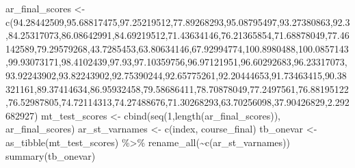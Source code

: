 \documentclass[
]{book}
\newenvironment{Shaded}{\begin{snugshade}}{\end{snugshade}}
\newcommand{\DecValTok}[1]{\textcolor[rgb]{0.00,0.00,0.81}{#1}}
\newcommand{\FloatTok}[1]{\textcolor[rgb]{0.00,0.00,0.81}{#1}}
\newcommand{\FunctionTok}[1]{\textcolor[rgb]{0.00,0.00,0.00}{#1}}
\newcommand{\NormalTok}[1]{#1}
\newcommand{\OtherTok}[1]{\textcolor[rgb]{0.56,0.35,0.01}{#1}}
\newcommand{\SpecialCharTok}[1]{\textcolor[rgb]{0.00,0.00,0.00}{#1}}
\newcommand{\StringTok}[1]{\textcolor[rgb]{0.31,0.60,0.02}{#1}}
\begin{document}
\begin{Shaded}
\begin{Highlighting}[]
\NormalTok{ar\_final\_scores }\OtherTok{\textless{}{-}} \FunctionTok{c}\NormalTok{(}\FloatTok{94.28442509}\NormalTok{,}\FloatTok{95.68817475}\NormalTok{,}\FloatTok{97.25219512}\NormalTok{,}\FloatTok{77.89268293}\NormalTok{,}\FloatTok{95.08795497}\NormalTok{,}\FloatTok{93.27380863}\NormalTok{,}\FloatTok{92.3}\NormalTok{,}\FloatTok{84.25317073}\NormalTok{,}\FloatTok{86.08642991}\NormalTok{,}\FloatTok{84.69219512}\NormalTok{,}\FloatTok{71.43634146}\NormalTok{,}\FloatTok{76.21365854}\NormalTok{,}\FloatTok{71.68878049}\NormalTok{,}\FloatTok{77.46142589}\NormalTok{,}\FloatTok{79.29579268}\NormalTok{,}\FloatTok{43.7285453}\NormalTok{,}\FloatTok{63.80634146}\NormalTok{,}\FloatTok{67.92994774}\NormalTok{,}\FloatTok{100.8980488}\NormalTok{,}\FloatTok{100.0857143}\NormalTok{,}\FloatTok{99.93073171}\NormalTok{,}\FloatTok{98.4102439}\NormalTok{,}\FloatTok{97.93}\NormalTok{,}\FloatTok{97.10359756}\NormalTok{,}\FloatTok{96.97121951}\NormalTok{,}\FloatTok{96.60292683}\NormalTok{,}\FloatTok{96.23317073}\NormalTok{,}\FloatTok{93.92243902}\NormalTok{,}\FloatTok{93.82243902}\NormalTok{,}\FloatTok{92.75390244}\NormalTok{,}\FloatTok{92.65775261}\NormalTok{,}\FloatTok{92.20444653}\NormalTok{,}\FloatTok{91.73463415}\NormalTok{,}\FloatTok{90.38321161}\NormalTok{,}\FloatTok{89.37414634}\NormalTok{,}\FloatTok{86.95932458}\NormalTok{,}\FloatTok{79.58686411}\NormalTok{,}\FloatTok{78.70878049}\NormalTok{,}\FloatTok{77.2497561}\NormalTok{,}\FloatTok{76.88195122}\NormalTok{,}\FloatTok{76.52987805}\NormalTok{,}\FloatTok{74.72114313}\NormalTok{,}\FloatTok{74.27488676}\NormalTok{,}\FloatTok{71.30268293}\NormalTok{,}\FloatTok{63.70256098}\NormalTok{,}\FloatTok{37.90426829}\NormalTok{,}\FloatTok{2.292682927}\NormalTok{)}
\NormalTok{mt\_test\_scores }\OtherTok{\textless{}{-}} \FunctionTok{cbind}\NormalTok{(}\FunctionTok{seq}\NormalTok{(}\DecValTok{1}\NormalTok{,}\FunctionTok{length}\NormalTok{(ar\_final\_scores)), ar\_final\_scores)}
\NormalTok{ar\_st\_varnames }\OtherTok{\textless{}{-}} \FunctionTok{c}\NormalTok{(}\StringTok{\textquotesingle{}index\textquotesingle{}}\NormalTok{, }\StringTok{\textquotesingle{}course\_final\textquotesingle{}}\NormalTok{)}
\NormalTok{tb\_onevar }\OtherTok{\textless{}{-}} \FunctionTok{as\_tibble}\NormalTok{(mt\_test\_scores) }\SpecialCharTok{\%\textgreater{}\%} \FunctionTok{rename\_all}\NormalTok{(}\SpecialCharTok{\textasciitilde{}}\FunctionTok{c}\NormalTok{(ar\_st\_varnames))}
\FunctionTok{summary}\NormalTok{(tb\_onevar)}
\end{Highlighting}
\end{Shaded}
\end{document}
